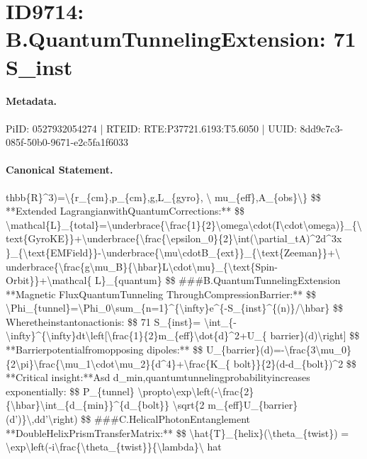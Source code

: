 \section*{ID9714: B.QuantumTunnelingExtension: 71 S\_inst}
\paragraph{Metadata.}
PiID: 0527932054274 | RTEID: RTE:P37721.6193:T5.6050 | UUID: 8dd9c7c3-085f-50b0-9671-e2c5fa1f6033

\paragraph{Canonical Statement.}
thbb\{R\}\textasciicircum{}3)=\textbackslash{}\{r\_\{cm\},p\_\{cm\},g,L\_\{gyro\}, \textbackslash{} mu\_\{eff\},A\_\{obs\}\textbackslash{}\} \$\$ **Extended LagrangianwithQuantumCorrections:** \$\$ \textbackslash{}mathcal\{L\}\_\{total\}=\textbackslash{}underbrace\{\textbackslash{}frac\{1\}\{2\}\textbackslash{}omega\textbackslash{}cdot(I\textbackslash{}cdot\textbackslash{}omega)\}\_\{\textbackslash{} text\{GyroKE\}\}+\textbackslash{}underbrace\{\textbackslash{}frac\{\textbackslash{}epsilon\_0\}\{2\}\textbackslash{}int(\textbackslash{}partial\_tA)\textasciicircum{}2d\textasciicircum{}3x \}\_\{\textbackslash{}text\{EMField\}\}-\textbackslash{}underbrace\{\textbackslash{}mu\textbackslash{}cdotB\_\{ext\}\}\_\{\textbackslash{}text\{Zeeman\}\}+\textbackslash{} underbrace\{\textbackslash{}frac\{g\textbackslash{}mu\_B\}\{\textbackslash{}hbar\}L\textbackslash{}cdot\textbackslash{}mu\}\_\{\textbackslash{}text\{Spin-Orbit\}\}+\textbackslash{}mathcal\{ L\}\_\{quantum\} \$\$ \#\#\#B.QuantumTunnelingExtension **Magnetic FluxQuantumTunneling ThroughCompressionBarrier:** \$\$ \textbackslash{}Phi\_\{tunnel\}=\textbackslash{}Phi\_0\textbackslash{}sum\_\{n=1\}\textasciicircum{}\{\textbackslash{}infty\}e\textasciicircum{}\{-S\_\{inst\}\textasciicircum{}\{(n)\}/\textbackslash{}hbar\} \$\$ Wheretheinstantonactionis: \$\$ 71 S\_\{inst\}= \textbackslash{}int\_\{-\textbackslash{}infty\}\textasciicircum{}\{\textbackslash{}infty\}dt\textbackslash{}left[\textbackslash{}frac\{1\}\{2\}m\_\{eff\}\textbackslash{}dot\{d\}\textasciicircum{}2+U\_\{ barrier\}(d)\textbackslash{}right] \$\$ **Barrierpotentialfromopposing dipoles:** \$\$ U\_\{barrier\}(d)=-\textbackslash{}frac\{3\textbackslash{}mu\_0\}\{2\textbackslash{}pi\}\textbackslash{}frac\{\textbackslash{}mu\_1\textbackslash{}cdot\textbackslash{}mu\_2\}\{d\textasciicircum{}4\}+\textbackslash{}frac\{K\_\{ bolt\}\}\{2\}(d-d\_\{bolt\})\textasciicircum{}2 \$\$ **Critical insight:**Asd d\_min,quantumtunnelingprobabilityincreases exponentially: \$\$ P\_\{tunnel\} \textbackslash{}propto\textbackslash{}exp\textbackslash{}left(-\textbackslash{}frac\{2\}\{\textbackslash{}hbar\}\textbackslash{}int\_\{d\_\{min\}\}\textasciicircum{}\{d\_\{bolt\}\} \textbackslash{}sqrt\{2 m\_\{eff\}U\_\{barrier\}(d’)\}\textbackslash{},dd’\textbackslash{}right) \$\$ \#\#\#C.HelicalPhotonEntanglement **DoubleHelixPrismTransferMatrix:** \$\$ \textbackslash{}hat\{T\}\_\{helix\}(\textbackslash{}theta\_\{twist\}) = \textbackslash{}exp\textbackslash{}left(-i\textbackslash{}frac\{\textbackslash{}theta\_\{twist\}\}\{\textbackslash{}lambda\}\textbackslash{} hat

